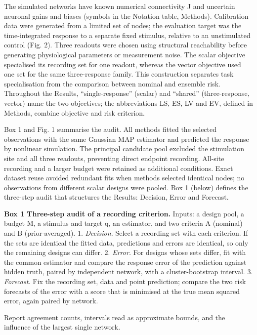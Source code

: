 The simulated networks have known numerical connectivity J and uncertain neuronal gains and biases (symbols in the Notation table, Methods). Calibration data were generated from a limited set of nodes; the evaluation target was the time-integrated response to a separate fixed stimulus, relative to an unstimulated control (Fig. 2). Three readouts were chosen using structural reachability before generating physiological parameters or measurement noise. The scalar objective specialised its recording set for one readout, whereas the vector objective used one set for the same three-response family. This construction separates task specialisation from the comparison between nominal and ensemble risk. Throughout the Results, ``single-response'' (scalar) and ``shared'' (three-response, vector) name the two objectives; the abbreviations LS, ES, LV and EV, defined in Methods, combine objective and risk criterion.

Box 1 and Fig. 1 summarise the audit. All methods fitted the selected observations with the same Gaussian MAP estimator and predicted the response by nonlinear simulation. The principal candidate pool excluded the stimulation site and all three readouts, preventing direct endpoint recording. All-site recording and a larger budget were retained as additional conditions. Exact dataset reuse avoided redundant fits when methods selected identical nodes; no observations from different scalar designs were pooled. Box 1 (below) defines the three-step audit that structures the Results: Decision, Error and Forecast.

\textbf{Box 1 \textbar{} Three-step audit of a recording criterion.} Inputs: a design pool, a budget M, a stimulus and target q, an estimator, and two criteria A (nominal) and B (prior-averaged). 1. \emph{Decision.} Select a recording set with each criterion. If the sets are identical the fitted data, predictions and errors are identical, so only the remaining designs can differ. 2. \emph{Error.} For designs whose sets differ, fit with the common estimator and compare the response error of the prediction against hidden truth, paired by independent network, with a cluster-bootstrap interval. 3. \emph{Forecast.} Fix the recording set, data and point prediction; compare the two risk forecasts of the error with a score that is minimised at the true mean squared error, again paired by network.

Report agreement counts, intervals read as approximate bounds, and the influence of the largest single network.

